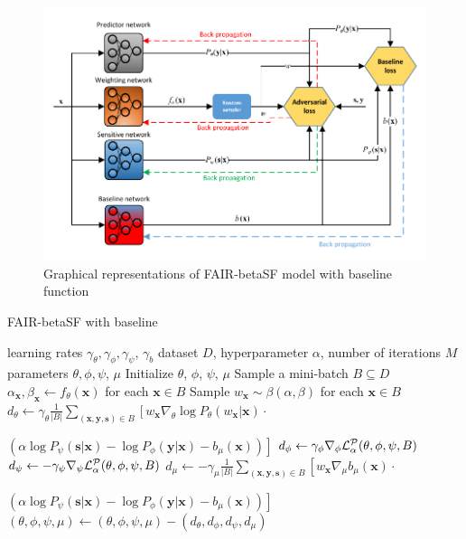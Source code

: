 \documentclass[preprint,12pt]{elsarticle}
\begin{document}
\begin{figure}[h!]
	\center
	\includegraphics[width=1\textwidth]{Fig2.pdf}
	\captionsetup{justification=centering}
	\caption{Graphical representations of FAIR-betaSF model with baseline function}
	\label{fig:Fig2}
\end{figure}

\begin{algorithm}[h!]
	\caption{FAIR-betaSF with baseline}
	\label{alg:beta-base}
	\begin{algorithmic}
		 learning rates $\gamma_\theta, \gamma_\phi, \gamma_\psi$, $\gamma_b$ dataset $D$,  hyperparameter $\alpha$, number of iterations $M$
		 parameters $\theta,\phi,\psi$, $\mu$
		\vspace{2mm}
		\State Initialize $\theta$, $\phi$, $\psi$, $\mu$
		\State Sample a mini-batch $B\subseteq D$
		\State $\alpha_\mathbf{x},\beta_\mathbf{x}\leftarrow f_\theta(\mathbf{x})$ for each $\mathbf{x}\in B$
		\State Sample $w_\mathbf{x}\sim \beta(\alpha,\beta)$ for each $\mathbf{x}\in B$
		\State $d_{\theta} \leftarrow \gamma_\theta\frac{1}{|B|} \sum_{(\mathbf{x},\mathbf{y},\mathbf{s})\in B}\left[w_\mathbf{x}\nabla_{\theta}\log P_\theta(w_\mathbf{x}|\mathbf{x})\cdot\right.$
		
		\hspace{1.5cm}$\left.(\alpha\log P_\psi(\mathbf{s}|\mathbf{x})-\log P_\phi(\mathbf{y}|\mathbf{x})-b_\mu(\textbf{x}))\right]$
		\State $d_{\phi} \leftarrow \gamma_\phi\nabla_{\phi}{\cal L}^{\cal P}_\alpha(\theta,\phi,\psi,B)$
		\State $d_{\psi} \leftarrow -\gamma_\psi\nabla_{\psi}{\cal L}^{\cal P}_\alpha(\theta,\phi,\psi,B)$
		\State $d_{\mu} \leftarrow -\gamma_\mu\frac{1}{|B|} \sum_{(\mathbf{x},\mathbf{y},\mathbf{s})\in B}\left[w_\mathbf{x}\nabla_\mu b_\mu(\mathbf{x})\cdot\right.$
		
		\hspace{1.5cm}$\left.(\alpha\log P_\psi(\mathbf{s}|\mathbf{x})-\log P_\phi(\mathbf{y}|\mathbf{x}) - b_\mu(\mathbf{x}))\right]$
		\State $(\theta,\phi,\psi,\mu) \leftarrow (\theta,\phi,\psi,\mu) - (d_{\theta},d_{\phi}, d_{\psi},  d_{\mu})$
		\EndFor
	\end{algorithmic}
\end{algorithm}
\end{document}
